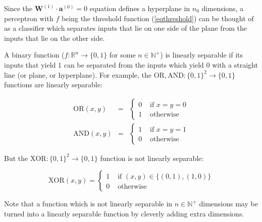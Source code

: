 \documentclass{article}
\begin{document}
            Since the $\mathbf{W}^{(1)} \cdot \mathbf{a}^{(0)} = 0$ equation
            defines a hyperplane in $n_0$ dimensions, a perceptron with $f$
            being the threshold function (\ref{eqthreshold}) can be thought
            of as a classifier which separates inputs that lie on one side of
            the plane from the inputs that lie on the other side.

            A binary function ($f : \mathbb{R}^n \rightarrow \{0, 1\}$ for some
            $n \in \mathbb{N}^+$) is linearly separable if its inputs that yield
            $1$ can be separated from the inputs which yield $0$ with a
            straight line (or plane, or hyperplane). For example, the
            $\text{OR}, \text{AND} : \{ 0, 1 \}^2 \rightarrow \{ 0, 1 \}$
            functions are linearly separable:

            \begin{eqnarray*}
              \text{OR}(x, y) & = & \begin{cases}
                  0 & \text{ if } x = y = 0 \\
                  1 & \text{ otherwise }
                \end{cases} \\
              \text{AND}(x, y) & = & \begin{cases}
                  1 & \text{ if } x = y = 1 \\
                  0 & \text{ otherwise}
                \end{cases}
            \end{eqnarray*}

            But the $\text{XOR} : \{ 0, 1 \}^2 \rightarrow \{ 0, 1 \}$ function
            is not linearly separable:

            \begin{equation*}
              \text{XOR}(x, y) = \begin{cases}
                  1 & \text{ if } (x, y) \in \{ (0, 1), (1, 0) \} \\
                  0 & \text{ otherwise}
                \end{cases}
            \end{equation*}

            Note that a function which is not linearly separable in
            $n \in \mathbb{N}^+$ dimensions may be turned into a linearly
            separable function by cleverly adding extra dimensions.

  \newpage
\end{document}
